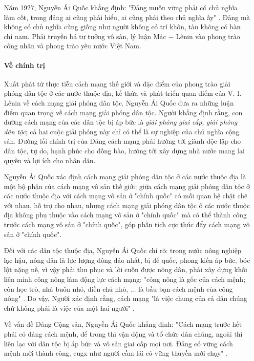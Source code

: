 Năm 1927, Nguyễn Ái Quốc khẳng định: "Đảng muốn vững phải có chủ nghĩa làm cốt, trong đảng ai cũng phải hiểu, ai cũng phải theo chủ nghĩa ấy" . Đảng mà không có chủ nghĩa cũng giống như người không có trí khôn, tàu không có bàn chỉ nam. Phải truyền bá tư tưởng vô sản, lý luận Mác $-$ Lênin vào phong trào công nhân và phong trào yêu nước Việt Nam.

\paragraph{Về chính trị}
Xuất phát từ thực tiễn cách mạng thế giới và đặc điểm của phong trào giải phóng dân tộc ở các nước thuộc địa, kế thừa và phát triển quan điểm của V. I. Lênin về cách mạng giải phóng dân tộc, Nguyễn Ái Quốc đưa ra những luận điểm quan trọng về  cách mạng giải phóng dân tộc. Người khẳng định rằng, con đường cách mạng của các dân tộc bị áp bức là \textit{giải phóng giai cấp, giải phóng dân tộc}; cả hai cuộc giải phóng này chỉ có thể là sự nghiệp của chủ nghĩa cộng sản. Đường lối chính trị của Đảng cách mạng phải hướng tới giành độc lập cho dân tộc, tự do, hạnh phúc cho đồng bào, hướng tới xây dựng nhà nước mang lại quyền và lợi ích cho nhân dân.

Nguyễn Ái Quốc xác định cách mạng giải phóng dân tộc ở các nước thuộc địa là một bộ phận của cách mạng vô sản thế giới; giữa cách mạng giải phóng dân tộc ở các nước thuộc địa với cách mạng vô sản ở "chính quốc" có mối quan hệ chặt chẽ với nhau, hỗ trợ cho nhau, nhưng cách mạng giải phóng dân tộc ở các nước thuộc địa không phụ thuộc vào cách mạng vô sản ở "chính quốc" mà có thể thành công trước cách mạng vô sản ở "chính quốc", góp phần tích cực thúc đẩy cách mạng vô sản ở "chính quốc".

Đối với các dân tộc thuộc địa, Nguyễn Ái Quốc chỉ rõ: trong nước nông nghiệp lạc hậu, nông dân là lực lượng đông đảo nhất, bị đế quốc, phong kiến áp bức, bóc lột nặng nề, vì vậy phải thu phục và lôi cuốn được nông dân, phải xây dựng khối liên minh công nông làm động lực cách mạng: "công nông là gốc của cách mệnh; còn học trò, nhà buôn nhỏ, điền chủ nhỏ, ... là bầu bạn cách mệnh của công nông" . Do vậy, Người xác định rằng, cách mạng "là việc chung của cả dân chúng chứ không phải là việc của một hai người" .

Về vấn đề Đảng Cộng sản, Nguyễn Ái Quốc khẳng định: "Cách mạng trước hết phải có đảng cách mệnh, để trong thì vận động và tổ chức dân chúng, ngoài thì liên lạc với dân tộc bị áp bức và vô sản giai cấp mọi nơi. Đảng có vững cách mệnh mới thành công, cugx như người cầm lái có vững thuyền mới chạy" . 

